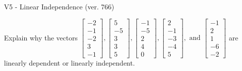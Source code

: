 \begin{exercise}
  \begin{exerciseTitle}V5 - Linear Independence (ver. 766)\end{exerciseTitle}
  \begin{exerciseStatement}
    Explain why the vectors \(\left[\begin{array}{r}
-2 \\
-1 \\
-2 \\
3 \\
-1
\end{array}\right] , \left[\begin{array}{r}
5 \\
-5 \\
3 \\
3 \\
5
\end{array}\right] , \left[\begin{array}{r}
-1 \\
-5 \\
2 \\
4 \\
0
\end{array}\right] , \left[\begin{array}{r}
2 \\
-1 \\
-3 \\
-4 \\
5
\end{array}\right] , \text{ and } \left[\begin{array}{r}
-1 \\
2 \\
1 \\
-6 \\
-2
\end{array}\right]\) are linearly dependent or linearly independent.	



\end{exerciseStatement}
\end{exercise}
